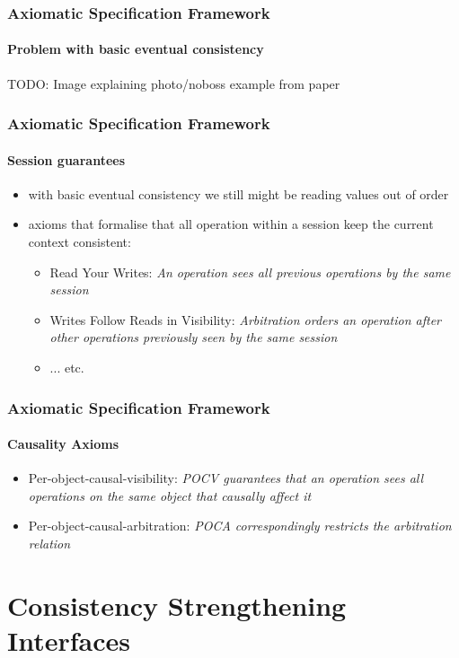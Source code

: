 \documentclass[11pt]{beamer}
\begin{document}
\begin{frame}
\frametitle{Axiomatic Specification Framework}
\framesubtitle{Problem with basic eventual consistency}
TODO: Image explaining photo/noboss example from paper
\end{frame}

\begin{frame}
\frametitle{Axiomatic Specification Framework}
\framesubtitle{Session guarantees}
\begin{itemize}
\item with basic eventual consistency we still might be reading values out of order
\item axioms that formalise that all operation within a session keep the current context consistent:
\begin{itemize}
\item Read Your Writes: \textit{An operation sees all previous operations
by the same session}
\item Writes Follow Reads in Visibility: \textit{Arbitration orders an
operation after other operations previously seen by the same session}
\item ... etc.
\end{itemize}
\end{itemize}
\end{frame}

\begin{frame}
\frametitle{Axiomatic Specification Framework}
\framesubtitle{Causality Axioms}
\begin{itemize}
\item Per-object-causal-visibility:
\textit{POCV guarantees that an operation sees all operations
on the same object that causally affect it}
\item Per-object-causal-arbitration:
\textit{POCA correspondingly
restricts the arbitration relation}
\end{itemize}
\end{frame}

\section{Consistency Strengthening Interfaces}
\end{document}
